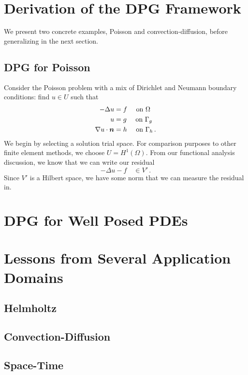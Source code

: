\documentclass{article}
\begin{document}
\section{Derivation of the DPG Framework}
We present two concrete examples, Poisson and convection-diffusion, before generalizing in the next section.
\subsection{DPG for Poisson}
Consider the Poisson problem with a mix of Dirichlet and Neumann boundary conditions: find $u\in U$ such that
\begin{align*}
-\Delta u&=f\quad\text{ on }\Omega\\
u&=g\quad\text{ on }\Gamma_g\\
\nabla u\cdot\boldsymbol n&=h\quad\text{ on }\Gamma_h\,.\\
\end{align*}
We begin by selecting a solution trial space.
For comparison purposes to other finite element methods, we choose $U=H^1(\Omega)$.
From our functional analysis discussion, we know that we can write our residual
\[
-\Delta u-f\quad\in V'\,.
\]
Since $V'$ is a Hilbert space, we have some norm that we can measure the residual in. 

\section{DPG for Well Posed PDEs}

\section{Lessons from Several Application Domains}

\subsection{Helmholtz}

\subsection{Convection-Diffusion}

\subsection{Space-Time}

 

\end{document}

